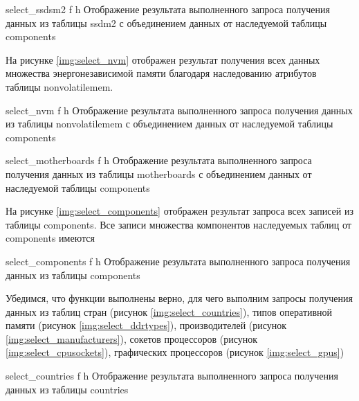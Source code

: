 {select_ssdsm2} %
{f} %
{h} %
{\textwidth} %
{Отображение результата выполненного запроса получения данных из таблицы ssdm2 с объединением данных от наследуемой таблицы components} %

На рисунке \ref{img:select_nvm} отображен результат получения всех данных множества энергонезависимой памяти благодаря наследованию атрибутов таблицы nonvolatilemem.

{select_nvm} %
{f} %
{h} %
{\textwidth} %
{Отображение результата выполненного запроса получения данных из таблицы nonvolatilemem с объединением данных от наследуемой таблицы components} %

{select_motherboards} %
{f} %
{h} %
{\textwidth} %
{Отображение результата выполненного запроса получения данных из таблицы motherboards с объединением данных от наследуемой таблицы components} %

На рисунке \ref{img:select_components} отображен результат запроса всех записей из таблицы components. Все записи множества компонентов наследуемых таблиц от components имеются

{select_components} %
{f} %
{h} %
{\textwidth} %
{Отображение результата выполненного запроса получения данных из таблицы components} %

Убедимся, что функции выполнены верно, для чего выполним запросы получения данных из таблиц стран (рисунок \ref{img:select_countries}), типов оперативной памяти (рисунок \ref{img:select_ddrtypes}), производителей (рисунок \ref{img:select_manufacturers}), сокетов процессоров (рисунок \ref{img:select_cpusockets}), графических процессоров (рисунок \ref{img:select_gpus})

{select_countries} %
{f} %
{h} %
{\textwidth} %
{Отображение результата выполненного запроса получения данных из таблицы countries} %

